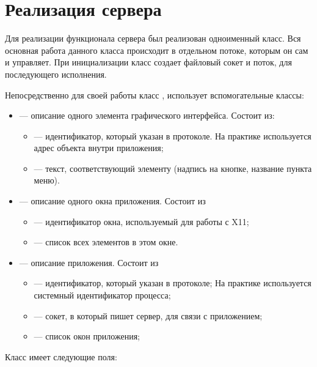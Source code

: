 \section{Реализация сервера}

Для реализации функционала сервера был реализован одноименный класс. Вся
основная работа данного класса происходит в отдельном потоке, которым он сам и
управляет. При инициализации класс создает файловый сокет и поток, для
последующего исполнения.

Непосредственно для своей работы класс , использует вспомогательные
классы:
\begin{itemize}
    \item {} — описание одного элемента графического интерфейса.
        Состоит из:
        \begin{itemize}
            \item {} — идентификатор, который указан в протоколе. На
                практике используется адрес объекта внутри приложения;
            \item {} — текст, соответствующий элементу (надпись на
                кнопке, название пункта меню).
        \end{itemize}

    \item {} — описание одного окна приложения. Состоит из
        \begin{itemize}
        \item {} — идентификатор окна, используемый для работы с X11;
        \item {} — список всех элементов в этом окне.
        \end{itemize}

    \item {} — описание приложения. Состоит из
        \begin{itemize}
        \item {} — идентификатор, который указан в протоколе; На
            практике используется системный идентификатор процесса;
        \item {} — сокет, в который пишет сервер, для связи с
            приложением;
        \item {} — список окон приложения;
        \end{itemize}
\end{itemize}

Класс  имеет следующие поля:

